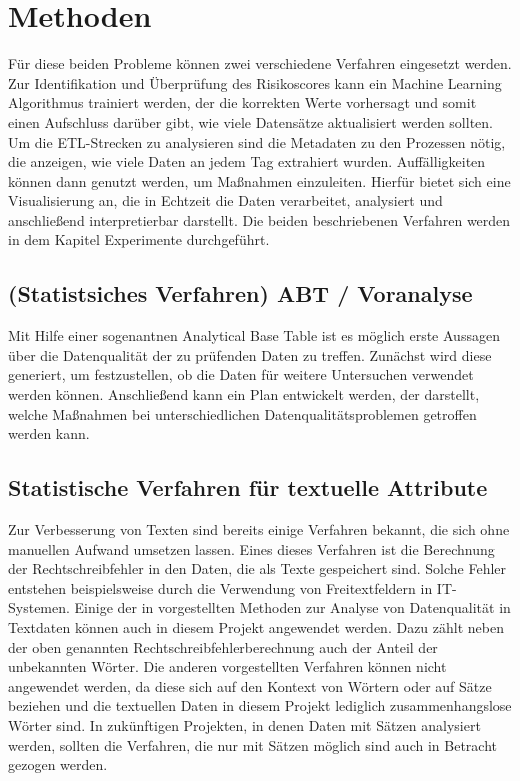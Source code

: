 \chapter{Methoden}\label{ch:method}

Für diese beiden Probleme können zwei verschiedene Verfahren eingesetzt werden.
Zur Identifikation und Überprüfung des Risikoscores kann ein Machine Learning Algorithmus trainiert werden, der die korrekten Werte vorhersagt und somit einen Aufschluss darüber gibt, wie viele Datensätze aktualisiert werden sollten.
Um die ETL-Strecken zu analysieren sind die Metadaten zu den Prozessen nötig, die anzeigen, wie viele Daten an jedem Tag extrahiert wurden. 
Auffälligkeiten können dann genutzt werden, um Maßnahmen einzuleiten.
Hierfür bietet sich eine Visualisierung an, die in Echtzeit die Daten verarbeitet, analysiert und anschließend interpretierbar darstellt.
Die beiden beschriebenen Verfahren werden in dem Kapitel Experimente durchgeführt. 


\section{(Statistsiches Verfahren) ABT / Voranalyse}
Mit Hilfe einer sogenantnen Analytical Base Table ist es möglich erste Aussagen über die Datenqualität der zu prüfenden Daten zu treffen.
Zunächst wird diese generiert, um festzustellen, ob die Daten für weitere Untersuchen verwendet werden können.
Anschließend kann ein Plan entwickelt werden, der darstellt, welche Maßnahmen bei unterschiedlichen Datenqualitätsproblemen getroffen werden kann.


\section{Statistische Verfahren für textuelle Attribute}
\label{sec:textVerfahren}
Zur Verbesserung von Texten sind bereits einige Verfahren bekannt, die sich ohne manuellen Aufwand umsetzen lassen.
Eines dieses Verfahren ist die Berechnung der Rechtschreibfehler in den Daten, die als Texte gespeichert sind. 
Solche Fehler entstehen beispielsweise durch die Verwendung von Freitextfeldern in IT-Systemen.  
Einige der in \cite{kiefer2019} vorgestellten Methoden zur Analyse von Datenqualität in Textdaten können auch in diesem Projekt angewendet werden. 
Dazu zählt neben der oben genannten Rechtschreibfehlerberechnung auch der Anteil der unbekannten Wörter. 
Die anderen vorgestellten Verfahren können nicht angewendet werden, da diese sich auf den Kontext von Wörtern oder auf Sätze beziehen und die textuellen Daten in diesem Projekt lediglich zusammenhangslose Wörter sind.
In zukünftigen Projekten, in denen Daten mit Sätzen analysiert werden, sollten die Verfahren, die nur mit Sätzen möglich sind auch in Betracht gezogen werden. \\

